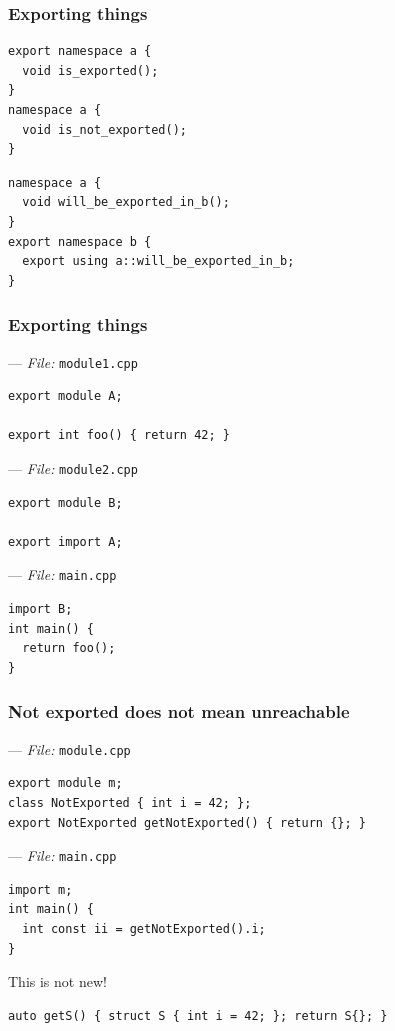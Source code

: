 \documentclass[aspectratio=169]{beamer}
\newif\iftransitions
\newcommand{\cpause}{\iftransitions \pause \fi}
\begin{document}
\begin{frame}[fragile]
  \frametitle{Exporting things}

  \begin{lstlisting}[style=cpp20]
export namespace a {
  void is_exported();
}
namespace a {
  void is_not_exported();
}
  \end{lstlisting}
  \cpause
  \begin{lstlisting}[style=cpp20]
namespace a {
  void will_be_exported_in_b();
}
export namespace b {
  export using a::will_be_exported_in_b;
}
  \end{lstlisting}
\end{frame}

\begin{frame}[fragile]
  \frametitle{Exporting things}
  
  --- \textit{File:} \texttt{module1.cpp}
  \begin{lstlisting}[style=cpp20]
export module A;

export int foo() { return 42; }
  \end{lstlisting}
  --- \textit{File:} \texttt{module2.cpp}
  \begin{lstlisting}[style=cpp20]
export module B;

export import A;
  \end{lstlisting}
  \cpause
  --- \textit{File:} \texttt{main.cpp}
  \begin{lstlisting}[style=cpp20]
import B;
int main() {
  return foo();
}
  \end{lstlisting}
\end{frame}

\begin{frame}[fragile]
  \frametitle{Not exported does not mean unreachable}

  --- \textit{File:} \texttt{module.cpp}
  \begin{lstlisting}[style=cpp20]
export module m;
class NotExported { int i = 42; };
export NotExported getNotExported() { return {}; }
  \end{lstlisting}
  \cpause
  --- \textit{File:} \texttt{main.cpp}
  \begin{lstlisting}[style=cpp20]
import m;
int main() {
  int const ii = getNotExported().i;
}
  \end{lstlisting}
  \cpause
  This is not new!
  \begin{lstlisting}[style=cpp20]
auto getS() { struct S { int i = 42; }; return S{}; }
  \end{lstlisting}
\end{frame}
\end{document}
